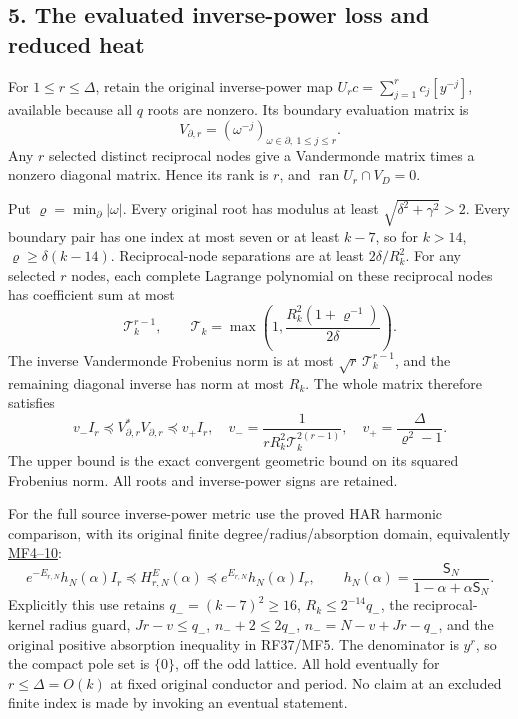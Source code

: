 \documentclass[11pt]{article}
\begin{document}
\subsection{5. The evaluated inverse-power loss and reduced heat}\label{the-evaluated-inverse-power-loss-and-reduced-heat}

For \(1\le r\le\Delta\), retain the original inverse-power map \(U_rc=\sum_{j=1}^r c_j[y^{-j}]\), available because all \(q\) roots are nonzero. Its boundary evaluation matrix is \[
V_{\partial,r}=(\omega^{-j})_{\omega\in\partial,\ 1\le j\le r}.
\] Any \(r\) selected distinct reciprocal nodes give a Vandermonde matrix times a nonzero diagonal matrix. Hence its rank is \(r\), and \(\operatorname{ran}U_r\cap V_D=0\).

Put \(\varrho=\min_{\partial}|\omega|\). Every original root has modulus at least \(\sqrt{\delta^2+\gamma^2}>2\). Every boundary pair has one index at most seven or at least \(k-7\), so for \(k>14\), \(\varrho\ge\delta(k-14)\). Reciprocal-node separations are at least \(2\delta/R_k^2\). For any selected \(r\) nodes, each complete Lagrange polynomial on these reciprocal nodes has coefficient sum at most \[
\mathcal T_k^{r-1},\qquad
\mathcal T_k=\max\left(1,\frac{R_k^2(1+\varrho^{-1})}{2\delta}\right).
\] The inverse Vandermonde Frobenius norm is at most \(\sqrt r\,\mathcal T_k^{r-1}\), and the remaining diagonal inverse has norm at most \(R_k\). The whole matrix therefore satisfies \[
v_-I_r\preceq V_{\partial,r}^*V_{\partial,r}\preceq v_+I_r,\quad
v_-=\frac1{rR_k^2\mathcal T_k^{2(r-1)}},\quad
v_+=\frac{\Delta}{\varrho^2-1}.
\tag{IC39}
\] The upper bound is the exact convergent geometric bound on its squared Frobenius norm. All roots and inverse-power signs are retained.

For the full source inverse-power metric use the proved HAR harmonic comparison, with its original finite degree/radius/absorption domain, equivalently \href{https://github.com/KokunoYumeto/zeta-function-research-reader/blob/cb9705da84d6f8689611914ed9659298e620ba0a/workbenches/splitzero-tandem/continuations/20260921-moving-rational-family/ACTIVATED_RATIONAL_PROOFS.md}{MF4--10}: \[
e^{-E_{r,N}}h_N(\alpha)I_r\preceq
H^E_{r,N}(\alpha)\preceq e^{E_{r,N}}h_N(\alpha)I_r,\qquad
h_N(\alpha)=\frac{\mathsf S_N}{1-\alpha+\alpha\mathsf S_N}.
\] Explicitly this use retains \(q_-=(k-7)^2\ge16\), \(R_k\le2^{-14}q_-\), the reciprocal-kernel radius guard, \(Jr-v\le q_-\), \(n_-+2\le2q_-\), \(n_-=N-v+Jr-q_-\), and the original positive absorption inequality in RF37/MF5. The denominator is \(y^r\), so the compact pole set is \(\{0\}\), off the odd lattice. All hold eventually for \(r\le\Delta=O(k)\) at fixed original conductor and period. No claim at an excluded finite index is made by invoking an eventual statement.
\end{document}
